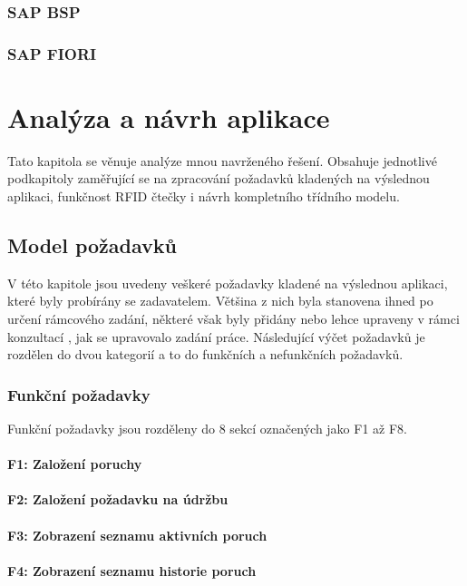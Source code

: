 \documentclass[thesis=M,czech]{FITthesis}[2012/06/26]
\begin{document}
\subsection{SAP BSP}

\subsection{SAP FIORI}

\chapter{Analýza a návrh aplikace}
Tato kapitola se věnuje analýze mnou navrženého řešení. Obsahuje jednotlivé podkapitoly zaměřující se na zpracování požadavků kladených na výslednou aplikaci, funkčnost RFID čtečky i návrh kompletního třídního modelu.	

\section{Model požadavků}
V této kapitole jsou uvedeny veškeré požadavky kladené na  výslednou aplikaci, které byly probírány se zadavatelem. Většina z nich byla stanovena ihned po určení rámcového zadání, některé však byly přidány nebo lehce upraveny v rámci konzultací , jak se upravovalo zadání práce. Následující výčet požadavků je rozdělen do dvou kategorií a to do funkčních a nefunkčních požadavků.  

\subsection{Funkční požadavky}
Funkční požadavky jsou rozděleny do 8 sekcí označených jako F1 až F8. 

\subsubsection{F1: Založení poruchy}
\subsubsection{F2: Založení požadavku na údržbu}
\subsubsection{F3: Zobrazení seznamu aktivních poruch}
\subsubsection{F4: Zobrazení seznamu historie poruch}
\end{document}
